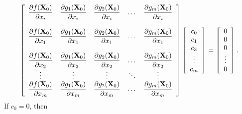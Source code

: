 \documentclass{article}
\newcommand{\dst}{\displaystyle}
\begin{document}
\begin{equation} \label{eq:35}
\left[\begin{array}{ccccccc}
\dst{\frac{\partial f({\bf X}_{0})}{\partial x_{i}}}&
\dst{\frac{\partial g_{1}({\bf X}_{0})}{\partial x_{i}}}&
\dst{\frac{\partial g_{2}({\bf X}_{0})}{\partial x_{i}}}&\dots&
\dst{\frac{\partial g_{m}({\bf X}_{0})}{\partial x_{i}}}\\\\
\dst{\frac{\partial f({\bf X}_{0})}{\partial x_{1}}}&
\dst{\frac{\partial g_{1}({\bf X}_{0})}{\partial x_{1}}}&
\dst{\frac{\partial g_{2}({\bf X}_{0})}{\partial x_{1}}}&\dots&
\dst{\frac{\partial g_{m}({\bf X}_{0})}{\partial x_{1}}}\\\\
\dst{\frac{\partial f({\bf X}_{0})}{\partial x_{2}}}&
\dst{\frac{\partial g_{1}({\bf X}_{0})}{\partial x_{2}}}&
\dst{\frac{\partial g_{2}({\bf X}_{0})}{\partial x_{2}}}&\dots&
\dst{\frac{\partial g_{m}({\bf X}_{0})}{\partial x_{2}}}\\
\vdots&\vdots&\vdots&\ddots&\vdots\\
\dst{\frac{\partial f({\bf X}_{0})}{\partial x_{m}}}&
\dst{\frac{\partial g_{1}({\bf X}_{0})}{\partial x_{m}}}&
\dst{\frac{\partial g_{2}({\bf X}_{0})}{\partial x_{m}}}&\dots&
\dst{\frac{\partial g_{m}({\bf X}_{0})}{\partial x_{m}}}\\
\end{array}\right]
\left[\begin{array}{ccccccc}
c_{0}\\c_{1}\\c_{3}\\\vdots\\c_{m}
\end{array}\right]=
\left[\begin{array}{ccccccc}
0\\0\\0\\\vdots\\0
\end{array}\right].
\end{equation}
If  $c_{0}=0$, then
\end{document}
